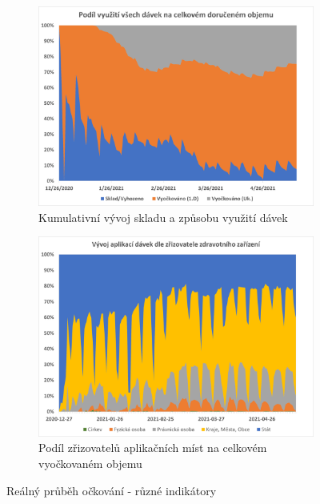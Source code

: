 \begin{figure}
\begin{subfigure}{0.45\textwidth}
\includegraphics[width=\textwidth]{assets/gr_vyuziti}
\caption{Kumulativní vývoj skladu a způsobu využití dávek}
\label{gr_vyuziti}
\end{subfigure}
%
\begin{subfigure}{0.45\textwidth}
\includegraphics[width=\textwidth]{assets/chart_zrizovatele}
\caption{Podíl zřizovatelů aplikačních míst na celkovém vyočkovaném objemu}
\label{gr_vyuziti_zrizovatele}
\end{subfigure}

\caption{Reálný průběh očkování - různé indikátory}
\label{gr_prehledy}

\end{figure}



